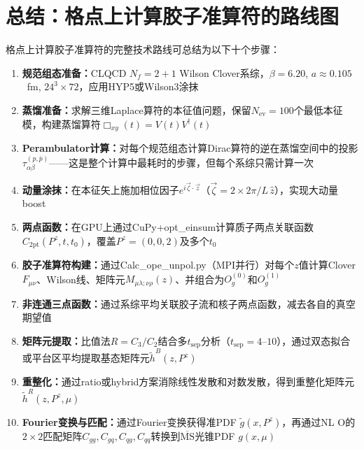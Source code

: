 \documentclass[12pt,a4paper]{ctexart}
\theoremstyle{definition}
\begin{document}
\section{总结：格点上计算胶子准算符的路线图}

格点上计算胶子准算符的完整技术路线可总结为以下十个步骤：

\begin{enumerate}
    \item \textbf{规范组态准备：}CLQCD $N_f=2+1$ Wilson Clover系综，$\beta=6.20$, $a\approx0.105$~fm, $24^3\times72$，应用HYP5或Wilson3涂抹\cite{NoteGluonPDFs,Chen2025gluon}

    \item \textbf{蒸馏准备：}求解三维Laplace算符的本征值问题，保留$N_{\text{ev}}=100$个最低本征模，构建蒸馏算符$\Box_{xy}(t)=V(t)V^\dagger(t)$\cite{Peardon2009,Egerer2021a}

    \item \textbf{Perambulator计算：}对每个规范组态计算Dirac算符的逆在蒸馏空间中的投影$\tau_{\alpha\beta}^{(p,\bar{p})}$——这是整个计算中最耗时的步骤，但每个系综只需计算一次\cite{NoteGluonPDFs,Peardon2009}

    \item \textbf{动量涂抹：}在本征矢上施加相位因子$e^{i\vec{\zeta}\cdot\vec{z}}$（$\vec{\zeta}=2\times2\pi/L\,\hat{z}$），实现大动量boost\cite{Egerer2021a,NoteGluonPDFs}

    \item \textbf{两点函数：}在GPU上通过CuPy+opt\_einsum计算质子两点关联函数$C_{2\text{pt}}(P^z,t,t_0)$，覆盖$P^z=(0,0,2)$及多个$t_0$\cite{代码解析}

    \item \textbf{胶子准算符构建：}通过Calc\_ope\_unpol.py（MPI并行）对每个$z$值计算Clover $F_{\mu\nu}$、Wilson线、矩阵元$M_{\mu\lambda;\nu\rho}(z)$、并组合为$O^{(0)}_g$和$O^{(1)}_g$\cite{NoteGluonPDFs,代码解析}

    \item \textbf{非连通三点函数：}通过系综平均关联胶子流和核子两点函数，减去各自的真空期望值\cite{NoteGluonPDFs,Chen2025gluon}

    \item \textbf{矩阵元提取：}比值法$R=C_3/C_2$结合多$t_{\text{sep}}$分析（$t_{\text{sep}}=4$--$10$），通过双态拟合或平台区平均提取基态矩阵元$\tilde{h}^B(z,P^z)$\cite{NoteGluonPDFs,本库补充3}

    \item \textbf{重整化：}通过ratio或hybrid方案消除线性发散和对数发散，得到重整化矩阵元$\tilde{h}^R(z,P^z,\mu)$\cite{Ji2021hybrid,Chen2025gluon}

    \item \textbf{Fourier变换与匹配：}通过Fourier变换获得准PDF $\tilde{g}(x,P^z)$，再通过NL O的$2\times2$匹配矩阵$C_{gg},C_{gq},C_{qg},C_{qq}$转换到$\overline{\text{MS}}$光锥PDF $g(x,\mu)$\cite{Yao2023,Zhang2019,代码解析}
\end{enumerate}
\end{document}
